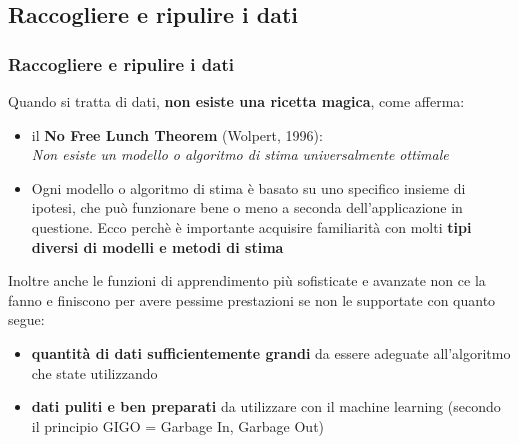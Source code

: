 \subsection[Raccogliere e ripulire i dati]{Raccogliere e ripulire i dati}

\begin{frame}

	\frametitle{{\color{GradientDescentDiagramBlue}Raccogliere e ripulire i dati}}

		Quando si tratta di dati, \textbf{non esiste una ricetta magica}, come afferma:
		\begin{itemize}
			\item il \textbf{No Free Lunch Theorem} (Wolpert, 1996):\\
				\emph{Non esiste un modello o algoritmo di stima universalmente ottimale}
			\item Ogni modello o algoritmo di stima è basato su uno specifico insieme di ipotesi, che può funzionare bene o meno a seconda dell'applicazione in questione. Ecco perchè è importante acquisire familiarità con molti \textbf{tipi diversi di modelli e metodi di stima}
%
		\end{itemize}

		Inoltre anche le funzioni di apprendimento più sofisticate e avanzate non ce la fanno e finiscono per avere pessime prestazioni se non le supportate con quanto segue:
		\begin{itemize}
			\item \textbf{quantità di dati sufficientemente grandi} da essere adeguate all'algoritmo che state utilizzando
			\item \textbf{dati puliti e ben preparati} da utilizzare con il machine learning (secondo il principio GIGO = Garbage In, Garbage Out)
		\end{itemize}


\end{frame}
